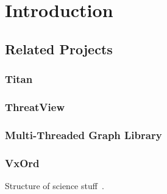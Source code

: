 \documentclass[pdf,12pt,report,strict]{SANDreport}
\newcommand*{\lcite}[1]{~\cite{#1}}
\newcommand{\titan}{Titan}
\newcommand{\threatview}{ThreatView\texttrademark\xspace}
\begin{document}


% 
\SANDmain		%

\chapter{Introduction}
\label{chap:Introduction}

\section{Related Projects}
\label{sec:RelatedProjects}

\subsection{\titan}
\label{sec:RelatedProjects:Titan}

\subsection{\threatview}
\label{sec:RelatedProjects:ThreatView}

\subsection{Multi-Threaded Graph Library}
\label{sec:RelatedProjects:MTGL}

\subsection{VxOrd}
\label{sec:RelatedProjects:VxOrd}

Structure of science stuff\lcite{Boyak04,Boyak05}.
\end{document}
